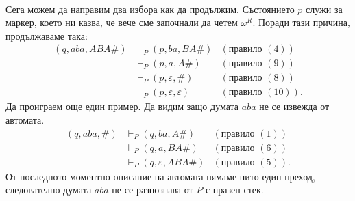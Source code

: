 \begin{example}
\begin{align*}
  \end{align*}
  Сега можем да направим два избора как да продължим. Състоянието $p$ служи за маркер, което ни казва, че вече сме започнали 
  да четем $\omega^R$. Поради тази причина, продължаваме така:
  \begin{align*}
    (q, aba, ABA\#) & \vdash_P (p, ba, BA\#) & (\text{правило }(4))\\
    & \vdash_P (p, a, A\#) & (\text{правило }(9))\\
    & \vdash_P (p, \varepsilon, \#) & (\text{правило }(8))\\
    & \vdash_P (p,\varepsilon,\varepsilon) & (\text{правило }(10)).
  \end{align*}
  Да проиграем още един пример. Да видим защо думата $aba$ не се извежда от автомата.
  \begin{align*}
    (q,aba,\#) & \vdash_P (q, ba,A\#) & (\text{правило }(1))\\
    & \vdash_P (q, a, BA\#) & (\text{правило }(6))\\
    & \vdash_P (q, \varepsilon, ABA\#) & (\text{правило }(5)).
  \end{align*}
  От последното моментно описание на автомата нямаме нито един преход, следователно
  думата $aba$ не се разпознава от $P$ с празен стек.
\end{example}

